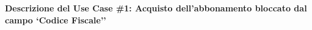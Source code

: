 \documentclass[11pt,a4paper]{article}
\begin{document}
\vspace{0.3cm}


\newpage


\begin{tcolorbox}[colback=primaryColor!10,colframe=primaryColor,arc=2mm]
    \textbf{Descrizione del Use Case \#1: Acquisto dell'abbonamento bloccato dal campo `Codice Fiscale''}
\end{tcolorbox}

\vspace{0.3cm}
\end{document}
